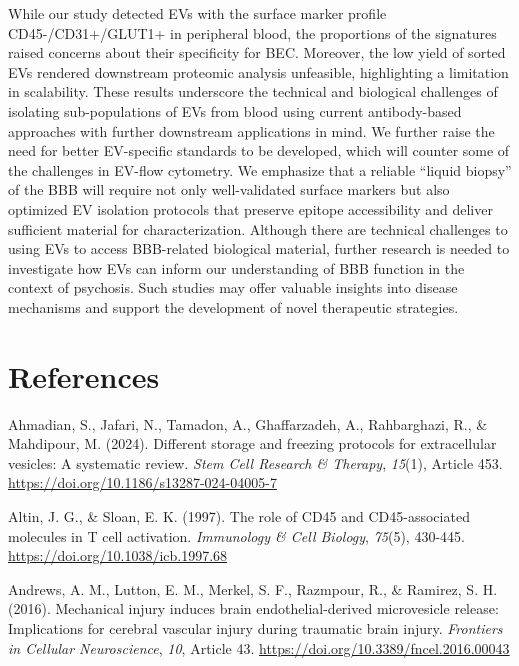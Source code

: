 \documentclass[authordate, empirical]{jote-new-article}
\begin{document}
	While our study detected EVs with the surface marker profile CD45-/CD31+/GLUT1+ in peripheral blood, the proportions of the signatures raised concerns about their specificity for BEC. Moreover, the low yield of sorted EVs rendered downstream proteomic analysis unfeasible, highlighting a limitation in scalability. These results underscore the technical and biological challenges of isolating sub-populations of EVs from blood using current antibody-based approaches with further downstream applications in mind. We further raise the need for better EV-specific standards to be developed, which will counter some of the challenges in EV-flow cytometry. We emphasize that a reliable “liquid biopsy” of the BBB will require not only well-validated surface markers but also optimized EV isolation protocols that preserve epitope accessibility and deliver sufficient material for characterization. Although there are technical challenges to using EVs to access BBB-related biological material, further research is needed to investigate how EVs can inform our understanding of BBB function in the context of psychosis. Such studies may offer valuable insights into disease mechanisms and support the development of novel therapeutic strategies.







	\section{References}



	Ahmadian, S., Jafari, N., Tamadon, A., Ghaffarzadeh, A., Rahbarghazi, R., \& Mahdipour, M. (2024). Different storage and freezing protocols for extracellular vesicles: A systematic review. \emph{Stem Cell Research \& Therapy},\emph{ 15}(1), Article 453. \url{https://doi.org/10.1186/s13287-024-04005-7}



	Altin, J. G., \& Sloan, E. K. (1997). The role of CD45 and CD45-associated molecules in T cell activation. \emph{Immunology \& Cell Biology},\emph{ 75}(5), 430-445. \url{https://doi.org/10.1038/icb.1997.68}



	Andrews, A. M., Lutton, E. M., Merkel, S. F., Razmpour, R., \& Ramirez, S. H. (2016). Mechanical injury induces brain endothelial-derived microvesicle release: Implications for cerebral vascular injury during traumatic brain injury. \emph{Frontiers in Cellular Neuroscience},\emph{ 10}, Article 43. \url{https://doi.org/10.3389/fncel.2016.00043}
\end{document}
